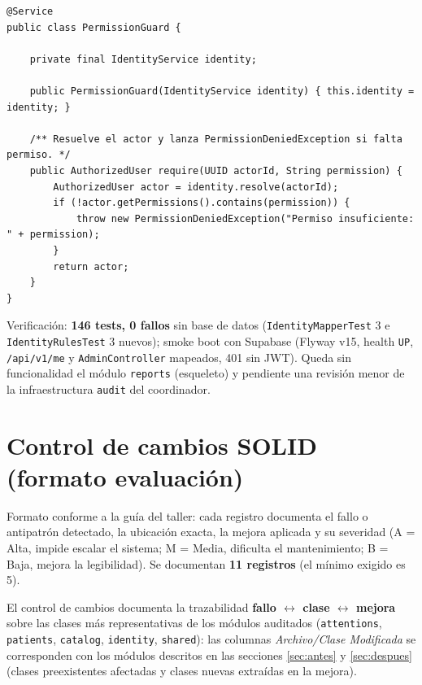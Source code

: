 \documentclass[11pt,a4paper]{article}
\begin{document}
\begin{lstlisting}[caption={PermissionGuard.java (después) --- guardia unica, SRP}]
@Service
public class PermissionGuard {

    private final IdentityService identity;

    public PermissionGuard(IdentityService identity) { this.identity = identity; }

    /** Resuelve el actor y lanza PermissionDeniedException si falta permiso. */
    public AuthorizedUser require(UUID actorId, String permission) {
        AuthorizedUser actor = identity.resolve(actorId);
        if (!actor.getPermissions().contains(permission)) {
            throw new PermissionDeniedException("Permiso insuficiente: " + permission);
        }
        return actor;
    }
}
\end{lstlisting}

Verificación: \textbf{146 tests, 0 fallos} sin base de datos
(\texttt{IdentityMapperTest} 3 e \texttt{IdentityRulesTest} 3 nuevos); smoke
boot con Supabase (Flyway v15, health \texttt{UP}, \texttt{/api/v1/me} y
\texttt{AdminController} mapeados, 401 sin JWT). Queda sin funcionalidad el
módulo \texttt{reports} (esqueleto) y pendiente una revisión menor de la
infraestructura \texttt{audit} del coordinador.

\section{Control de cambios SOLID (formato evaluación)} \label{sec:control-cambios}

Formato conforme a la guía del taller: cada registro documenta el fallo o
antipatrón detectado, la ubicación exacta, la mejora aplicada y su severidad
(A = Alta, impide escalar el sistema; M = Media, dificulta el mantenimiento;
B = Baja, mejora la legibilidad). Se documentan \textbf{11 registros} (el
mínimo exigido es 5).

El control de cambios documenta la trazabilidad \textbf{fallo $\leftrightarrow$ clase
$\leftrightarrow$ mejora} sobre las clases más representativas de los módulos auditados
(\texttt{attentions}, \texttt{patients}, \texttt{catalog}, \texttt{identity}, \texttt{shared}):
las columnas \textit{Archivo/Clase Modificada} se corresponden con los módulos descritos en
las secciones \ref{sec:antes} y \ref{sec:despues} (clases preexistentes afectadas y clases nuevas
extraídas en la mejora).
\end{document}
